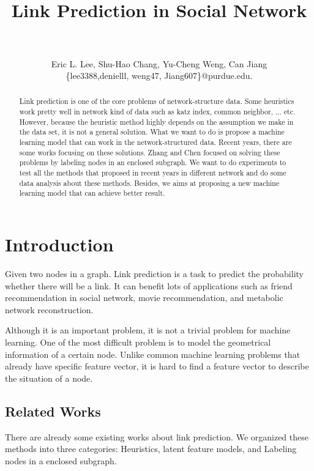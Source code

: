 \documentclass[paper=letter, fontsize=12pt]{scrartcl} %
\title{	
\normalfont \normalsize 
\horrule{2pt} \\[0.4cm] %
{\LARGE Link Prediction in Social Network} \\ %
\horrule{1pt} \\[0.5cm] %
}
\author{\large{Eric L. Lee, Shu-Hao Chang, Yu-Cheng Weng, Can Jiang}\\
  \normalsize{\{lee3388,denielll, weng47, Jiang607\}@purdue.edu.}
} %
\date{} %
\begin{document}
\maketitle %

\begin{abstract}
  Link prediction is one of the core problems of network-structure data. Some heuristics work pretty well in network kind of data such as katz index\cite{katz}, common neighbor, ... etc. However, because the heuristic method highly depends on the assumption we make in the data set, it is not a general solution. What we want to do is propose a machine learning model that can work in the network-structured data. Recent years, there are some works focusing on these solutions. Zhang and Chen \cite{lpnn} \cite{wlnn} focused on solving these problems by labeling nodes in an enclosed subgraph. We want to do experiments to test all the methods that proposed in recent years in different network and do some data analysis about these methods. Besides, we aims at proposing a new machine learning model that can achieve better result.
\end{abstract}

\section{Introduction}
Given two nodes in a graph. Link prediction is a task to predict the probability whether there will be a link. It can benefit lots of applications such as friend recommendation in social network, movie recommendation, and metabolic network reconstruction.

Although it is an important problem, it is not a trivial problem for machine learning. One of the most difficult problem is to model the geometrical information of a certain node. Unlike common machine learning problems that already have specific feature vector, it is hard to find a feature vector to describe the situation of a node.

\subsection {Related Works}
There are already some existing works about link prediction. We organized these methods into three categories: Heuristics, latent feature models, and  Labeling nodes in a enclosed subgraph.
\end{document}
